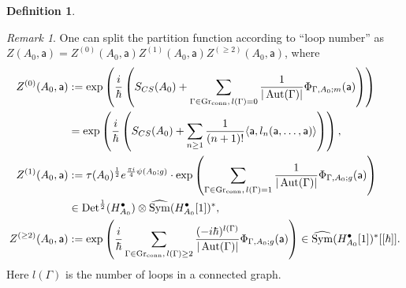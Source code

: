 \documentclass[11pt,a4paper]{amsart}
\theoremstyle{plain} %
\theoremstyle{definition}
\newtheorem{defn}[thm]{Definition}
\theoremstyle{remark}
\newtheorem{rem}[thm]{Remark}
\newcommand{\Sym}{\operatorname{Sym}}
\newcommand{\mr}{\mathrm}
\newcommand{\sfa}{\mathsf{a}}
\begin{document}
{\begin{defn}
\begin{itemize}
\begin{itemize}
    \end{itemize}
\end{itemize}
\end{defn}
\begin{rem}
One can split the partition function according to ``loop number'' as $Z(A_0,\sfa)=Z^{(0)}(A_0,\sfa)Z^{(1)}(A_0,\sfa)Z^{(\geq 2)}(A_0,\sfa)$, 
where 
\begin{align*}
Z^{(0)}(A_0,\mathsf{a}) &:=  
\exp\left(\frac{i}{\hbar}\left(S_{CS}(A_0)+\sum_{\Gamma \in \mr{Gr_{conn}},\, l(\Gamma) =  0} \frac{1}{|\operatorname{Aut}(\Gamma)|}\Phi_{\Gamma,A_0;m}(\mathsf{a})
\right)\right) 
\\
&=\exp\left(\frac{i}{\hbar}\left(S_{CS}(A_0)+\sum_{n \geq 1}\frac{1}{(n+1)!}\langle \sfa, l_n(\sfa,\ldots,\sfa)\rangle\right)\right), \\
Z^{(1)}(A_0,\mathsf{a}) &:= \tau(A_0)^{\frac12}e^{\frac{\pi i }{4}\psi(A_0;g)} \cdot \exp\left(\sum_{\Gamma \in \mr{Gr_{conn}},\, l(\Gamma) =  1} \frac{1}{|\operatorname{Aut}(\Gamma)|}\Phi_{\Gamma,A_0;g}(\mathsf{a})\right)
\\ &\in \mr{Det}^{\frac12}( H^\bullet_{A_0})\otimes\widehat{\Sym}(H^\bullet_{A_0}[1])^*, \notag\\
Z^{(\geq 2)}(A_0,\mathsf{a}) &:= \exp\left(\frac{i}{\hbar}\sum_{\Gamma \in \mr{Gr_{conn}},\,  l(\Gamma) \geq 2} \frac{(-i\hbar)^{l(\Gamma)}}{|\operatorname{Aut}(\Gamma)|}\Phi_{\Gamma,A_0;g}(\mathsf{a})\right) \in \widehat{\Sym}(H^\bullet_{A_0}[1])^*[[\hbar]].
\end{align*}
Here $l(\Gamma)$ is the number of loops in a connected graph.


\end{rem}}
\end{document}
